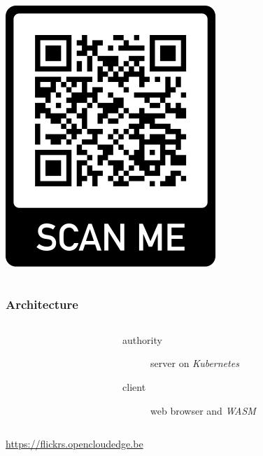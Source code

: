 \documentclass[aspectratio=169]{beamer}
\begin{document}
\begin{frame}
\begin{columns}
\begin{column}{.25\textwidth}
\begin{center}
        \includegraphics[width=\textwidth]{frame.png}
      \end{center}
    \end{column}
  \end{columns}
\end{frame}

\begin{frame}
  \frametitle{Architecture}
  \begin{columns}
    \begin{column}{.55\textwidth}
    \end{column}
    \begin{column}{.45\textwidth}
      \begin{description}
        \item[authority] server on \emph{Kubernetes}
        \item[client] web browser and \emph{WASM}
      \end{description}
    \end{column}
  \end{columns}

  \medskip

  {\small \url{https://flickrs.opencloudedge.be}}
\end{frame}
\end{document}
